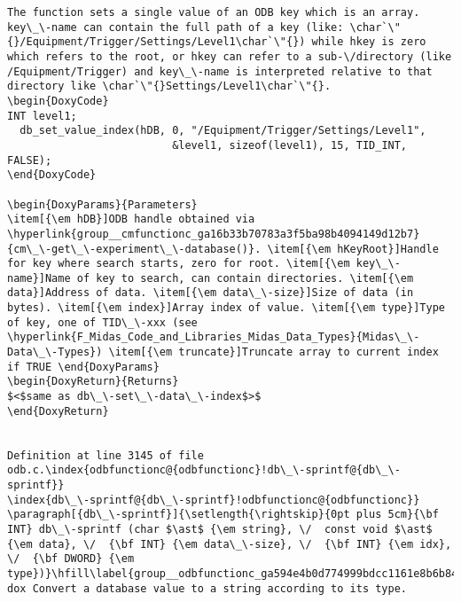 \begin{DoxyItemize}
\begin{DoxyCode}
\begin{verbatim}
The function sets a single value of an ODB key which is an array. key\_\-name can contain the full path of a key (like: \char`\"{}/Equipment/Trigger/Settings/Level1\char`\"{}) while hkey is zero which refers to the root, or hkey can refer to a sub-\/directory (like /Equipment/Trigger) and key\_\-name is interpreted relative to that directory like \char`\"{}Settings/Level1\char`\"{}. 
\begin{DoxyCode}
INT level1;
  db_set_value_index(hDB, 0, "/Equipment/Trigger/Settings/Level1",
                          &level1, sizeof(level1), 15, TID_INT, FALSE);
\end{DoxyCode}
 
\begin{DoxyParams}{Parameters}
\item[{\em hDB}]ODB handle obtained via \hyperlink{group__cmfunctionc_ga16b33b70783a3f5ba98b4094149d12b7}{cm\_\-get\_\-experiment\_\-database()}. \item[{\em hKeyRoot}]Handle for key where search starts, zero for root. \item[{\em key\_\-name}]Name of key to search, can contain directories. \item[{\em data}]Address of data. \item[{\em data\_\-size}]Size of data (in bytes). \item[{\em index}]Array index of value. \item[{\em type}]Type of key, one of TID\_\-xxx (see \hyperlink{F_Midas_Code_and_Libraries_Midas_Data_Types}{Midas\_\-Data\_\-Types}) \item[{\em truncate}]Truncate array to current index if TRUE \end{DoxyParams}
\begin{DoxyReturn}{Returns}
$<$same as db\_\-set\_\-data\_\-index$>$ 
\end{DoxyReturn}


Definition at line 3145 of file odb.c.\index{odbfunctionc@{odbfunctionc}!db\_\-sprintf@{db\_\-sprintf}}
\index{db\_\-sprintf@{db\_\-sprintf}!odbfunctionc@{odbfunctionc}}
\paragraph[{db\_\-sprintf}]{\setlength{\rightskip}{0pt plus 5cm}{\bf INT} db\_\-sprintf (char $\ast$ {\em string}, \/  const void $\ast$ {\em data}, \/  {\bf INT} {\em data\_\-size}, \/  {\bf INT} {\em idx}, \/  {\bf DWORD} {\em type})}\hfill\label{group__odbfunctionc_ga594e4b0d774999bdcc1161e8b6b84052}
dox Convert a database value to a string according to its type.


\end{verbatim}
\end{DoxyCode}
\end{DoxyItemize}
